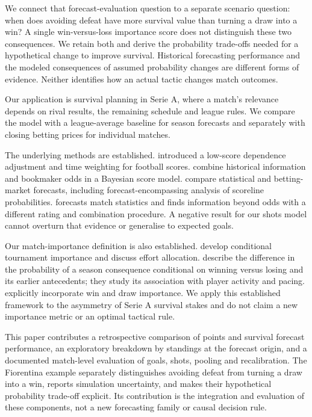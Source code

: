 \documentclass[11pt]{article}
\begin{document}
We connect that forecast-evaluation question to a separate scenario question:
when does avoiding defeat have more survival value than turning a draw into a
win? A single win-versus-loss importance score does not distinguish these two
consequences. We retain both and derive the probability trade-offs needed for a
hypothetical change to improve survival. Historical forecasting performance and
the modeled consequences of assumed probability changes are different forms of
evidence. Neither identifies how an actual tactic changes match outcomes.

Our application is survival planning in Serie A, where a match's relevance
depends on rival results, the remaining schedule and league rules. We compare
the model with a league-average baseline for season forecasts and separately
with closing betting prices for individual matches.

The underlying methods are established. \citet{dc} introduced a low-score
dependence adjustment and time weighting for football scores.
\citet{egidi} combine historical information and bookmaker odds in a Bayesian
score model. \citet{reade} compare statistical and betting-market forecasts,
including forecast-encompassing analysis of scoreline probabilities.
\citet{wheatcroft} forecasts match statistics and finds information beyond odds
with a different rating and combination procedure. A negative result for our
shots model cannot overturn that evidence or generalise to expected goals.

Our match-importance definition is also established. \citet{scarf} develop
conditional tournament importance and discuss effort allocation.
\citet{link} describe the difference in the probability of a season consequence
conditional on winning versus losing and its earlier antecedents; they study
its association with player activity and pacing. \citet{delorenzo} explicitly
incorporate win and draw importance. We apply this established framework to
the asymmetry of Serie A survival stakes and do not claim a new importance
metric or an optimal tactical rule.

This paper contributes a retrospective comparison of points and survival
forecast performance, an exploratory breakdown by standings at the forecast
origin, and a documented match-level evaluation of goals, shots, pooling and
recalibration. The Fiorentina example separately distinguishes avoiding defeat from turning a
draw into a win, reports simulation uncertainty, and makes their hypothetical
probability trade-off explicit. Its contribution is the integration and
evaluation of these components, not a new forecasting family or causal
decision rule.
\end{document}

